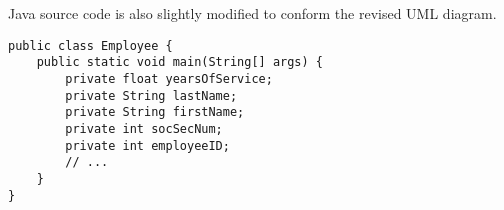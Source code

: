 Java source code is also slightly modified to conform the revised UML diagram.

\begin{lstlisting}
public class Employee {
	public static void main(String[] args) {
		private float yearsOfService;
		private String lastName;
		private String firstName;
		private int socSecNum;
		private int employeeID;
		// ...
	}
}
\end{lstlisting}

\begin{appendix}
	\listoffigures
	\listoftables
\end{appendix}
